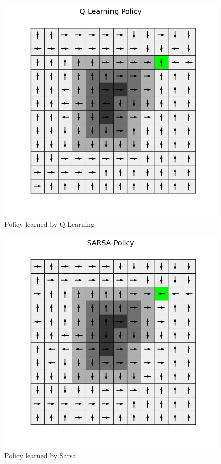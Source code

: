 \documentclass[a4paper]{article}
\begin{document}
\begin{figure}[htbp!]
\center
\includegraphics[scale=0.75]{B/Q-Learning-policy.png}
\caption{Policy learned by Q-Learning}
\end{figure}

\begin{figure}[htbp!]
\center
\includegraphics[scale=0.75]{B/SARSA-policy.png}
\caption{Policy learned by Sarsa}
\end{figure}
\end{document}
